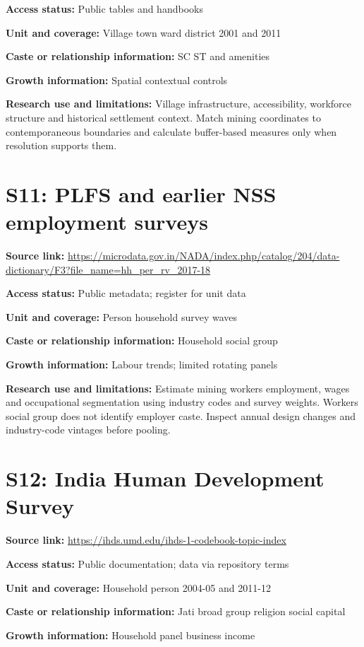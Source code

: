 \documentclass[11pt,a4paper]{report}
\begin{document}
\textbf{Access status:} Public tables and handbooks

\textbf{Unit and coverage:} Village town ward district 2001 and 2011

\textbf{Caste or relationship information:} SC ST and amenities

\textbf{Growth information:} Spatial contextual controls

\textbf{Research use and limitations:} Village infrastructure, accessibility, workforce structure and historical settlement context. Match mining coordinates to contemporaneous boundaries and calculate buffer-based measures only when resolution supports them.

\section{S11: PLFS and earlier NSS employment surveys}\hypertarget{S11}{}
\textbf{Source link:} \url{https://microdata.gov.in/NADA/index.php/catalog/204/data-dictionary/F3?file_name=hh_per_rv_2017-18}

\textbf{Access status:} Public metadata; register for unit data

\textbf{Unit and coverage:} Person household survey waves

\textbf{Caste or relationship information:} Household social group

\textbf{Growth information:} Labour trends; limited rotating panels

\textbf{Research use and limitations:} Estimate mining workers employment, wages and occupational segmentation using industry codes and survey weights. Workers social group does not identify employer caste. Inspect annual design changes and industry-code vintages before pooling.

\section{S12: India Human Development Survey}\hypertarget{S12}{}
\textbf{Source link:} \url{https://ihds.umd.edu/ihds-1-codebook-topic-index}

\textbf{Access status:} Public documentation; data via repository terms

\textbf{Unit and coverage:} Household person 2004-05 and 2011-12

\textbf{Caste or relationship information:} Jati broad group religion social capital

\textbf{Growth information:} Household panel business income
\end{document}
